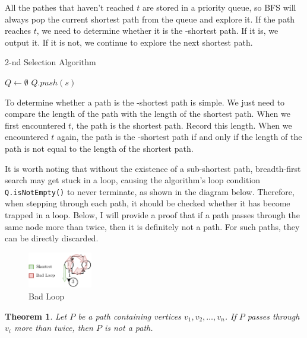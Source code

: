 \documentclass[a4paper,oneside]{book}
\newtheorem{theorem}{Theorem}[section]
\begin{document}
All the pathes that haven't reached $t$ are stored in a priority queue, so BFS will always pop the current shortest path from the queue and explore it. If the path reaches $t$, we need to determine whether it is the -shortest path. If it is, we output it. If it is not, we continue to explore the next shortest path.

\begin{algorithm}[H]
    \caption{2-nd Selection Algorithm}\label{alg:2}
    \DontPrintSemicolon
    \BlankLine
    $Q \gets \emptyset$\;
    $Q.push(s)$\;
    \;
\end{algorithm}

To determine whether a path is the -shortest path is simple. We just need to compare the length of the path with the length of the shortest path. When we first encountered $t$, the path is the shortest path. Record this length. When we encountered $t$ again, the path is the -shortest path if and only if the length of the path is not equal to the length of the shortest path.

It is worth noting that without the existence of a sub-shortest path, breadth-first search may get stuck in a loop, causing the algorithm's loop condition \verb|Q.isNotEmpty()| to never terminate, as shown in the diagram below. Therefore, when stepping through each path, it should be checked whether it has become trapped in a loop. Below, I will provide a proof that if a path passes through the same node more than twice, then it is definitely not a  path. For such paths, they can be directly discarded.

\begin{figure}[!ht]
    \centering
    \caption{Bad Loop}
    \includegraphics[width=0.25\textwidth]{src/bad_loop.drawio.pdf}
\end{figure}

\begin{theorem}\label{thm:1}
    Let $P$ be a path containing vertices $v_1, v_2, \dots, v_n$. If $P$ passes through $v_i$ more than twice, then $P$ is not a  path.
\end{theorem}
\end{document}
